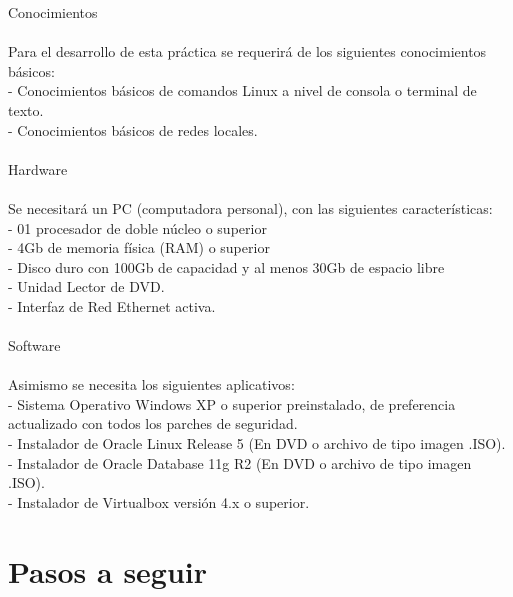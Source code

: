 \begin{itemize}
Conocimientos\\\\
Para el desarrollo de esta práctica se requerirá de los siguientes conocimientos básicos:\\
- Conocimientos básicos de comandos Linux a nivel de consola o terminal de texto.\\
- Conocimientos básicos de redes locales.\\\\

Hardware\\\\
Se necesitará un PC (computadora personal), con las siguientes características:\\
- 01 procesador de doble núcleo o superior\\
- 4Gb de memoria física (RAM) o superior\\
- Disco duro con 100Gb de capacidad y al menos 30Gb de espacio libre\\
- Unidad Lector de DVD.\\
- Interfaz de Red Ethernet activa.\\\\

Software\\\\
Asimismo se necesita los siguientes aplicativos:\\
- Sistema Operativo Windows XP o superior preinstalado, de preferencia actualizado    con todos los parches de seguridad.\\
- Instalador de Oracle Linux Release 5 (En DVD o archivo de tipo imagen .ISO).\\
- Instalador de Oracle Database 11g R2 (En DVD o archivo de tipo imagen .ISO).\\
- Instalador de Virtualbox versión 4.x o superior.\\

\end{itemize} 

\section{Pasos a seguir}
\begin{itemize}
    
    
\end{itemize}
